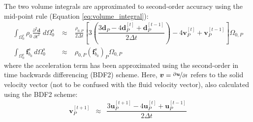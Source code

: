 \documentclass[sn-mathphys,Numbered]{sn-jnl}%
\newcommand{\bb}{\boldsymbol}
\begin{document}
The two volume integrals are approximated to second-order accuracy using the mid-point rule (Equation \ref{eq:volume_integral}):
\begin{eqnarray}
	\int_{\Omega_0^s} \rho_0 \frac{\partial^2 \bb{d} }{\partial t^2} \; d\Omega_0^s
		\;&\approx&\; \frac{\rho_{0,P}}{2\Delta t}
		\left[
			3\left( 
			\dfrac{3\boldsymbol{d}_P - 4\boldsymbol{d}_P^{[t]} + \boldsymbol{d}_P^{[t-1]}}{2\Delta t} 
			\right) 
			- 4\boldsymbol{v}_P^{[t]} + \boldsymbol{v}_P^{[t-1]}
		\right] \Omega_{0,P} \\
	\int_{\Omega_0^s}  \bb{f}_{b_0}^s \, d\Omega_0^s
		\;&\approx&\;  \rho_{0,P} \left(\bb{f}^s_{b_0}\right)_P \Omega_{0,P}
\end{eqnarray}
where the acceleration term has been approximated using the second-order in time backwards differencing (BDF2) scheme.
Here, $\boldsymbol{v} = \nicefrac{\partial \bb{u}}{\partial t}$ refers to the solid velocity vector (not to be confused with the fluid velocity vector), also calculated using the BDF2 scheme:
 \begin{eqnarray}
	\boldsymbol{v}_P^{[t+1]}	&\approx&
		\dfrac{3\boldsymbol{u}_P^{[t+1]} - 4\boldsymbol{u}_P^{[t]} + \boldsymbol{u}_P^{[t-1]}}{2\Delta t} 
\end{eqnarray}
\end{document}
